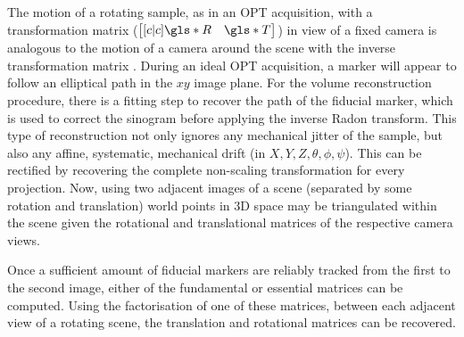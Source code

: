 \documentclass{osa-article}
\begin{document}
The motion of a rotating sample, as in an OPT acquisition, with a transformation matrix (\( \begin{bmatrix}[c|c] \gls*{R} & \gls*{T} \end{bmatrix}\)) in view of a fixed camera is analogous to the motion of a camera around the scene with the inverse transformation matrix . %
During an ideal OPT acquisition, a marker will appear to follow an elliptical path in the \(xy\) image plane.
For the volume reconstruction procedure, there is a fitting step to recover the path of the fiducial marker, which is used to correct the sinogram before applying the inverse Radon transform.
This type of reconstruction not only ignores any mechanical jitter of the sample, but also any affine, systematic, mechanical drift (in \(X,Y,Z,\theta,\phi,\psi \)). %
This can be rectified by recovering the complete non-scaling transformation for every projection.
Now, using two adjacent images of a scene (separated by some rotation and translation) world points in 3D space may be triangulated within the scene given the rotational and translational matrices of the respective camera views.



Once a sufficient amount of fiducial markers are reliably tracked from the first to the second image, either of the fundamental or essential matrices can be computed. Using the factorisation of one of these matrices, between each adjacent view of a rotating scene, the translation and rotational matrices can be recovered.
\end{document}
